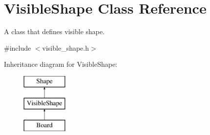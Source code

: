 \hypertarget{class_visible_shape}{}\section{Visible\+Shape Class Reference}
\label{class_visible_shape}


A class that defines visible shape.  




{\ttfamily \#include $<$visible\+\_\+shape.\+h$>$}

Inheritance diagram for Visible\+Shape\+:\begin{figure}[H]
\begin{center}
\leavevmode
\includegraphics[height=3.000000cm]{class_visible_shape}
\end{center}
\end{figure}
